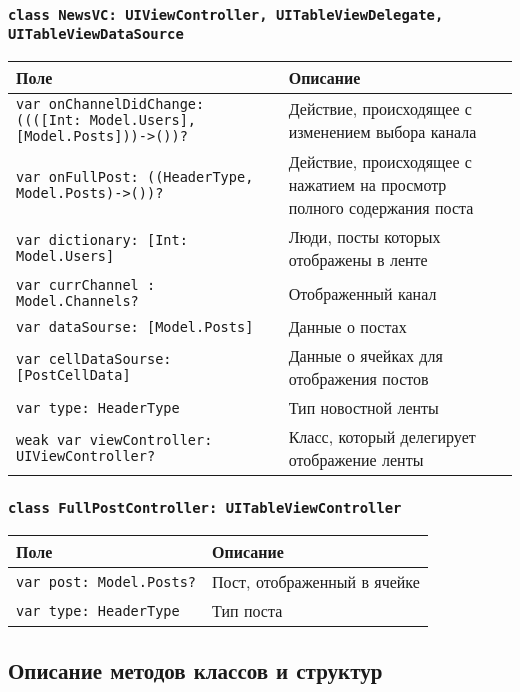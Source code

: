 \subsubsection*{\texttt{class NewsVC: UIViewController, UITableViewDelegate, UITableViewDataSource}}

\begin{longtable}{| >{\raggedright\arraybackslash}p{} | p{}|}
\hline
\textbf{Поле} & \textbf{Описание} \\ \hline
\texttt{var onChannelDidChange: ((([Int: Model.Users],[Model.Posts]))->())?} & {Действие, происходящее с изменением выбора канала} \\ \hline
\texttt{var onFullPost: ((HeaderType, Model.Posts)->())?} & {Действие, происходящее с нажатием на просмотр полного содержания поста} \\ \hline
\texttt{var dictionary: [Int: Model.Users] } & {Люди, посты которых отображены в ленте} \\ \hline
\texttt{var currChannel : Model.Channels?} & {Отображенный канал} \\ \hline
\texttt{var dataSourse: [Model.Posts] } & {Данные о постах} \\ \hline
\texttt{var cellDataSourse: [PostCellData] } & {Данные о ячейках для отображения постов} \\ \hline
\texttt{var type: HeaderType } & {Тип новостной ленты} \\ \hline
\texttt{weak var viewController: UIViewController?} & {Класс, который делегирует отображение ленты} \\ \hline
\end{longtable}

\subsubsection*{\texttt{class FullPostController: UITableViewController}}

\begin{longtable}{| >{\raggedright\arraybackslash}p{} | p{}|}
\hline
\textbf{Поле} & \textbf{Описание} \\ \hline
\texttt{var post: Model.Posts?} & {Пост, отображенный в ячейке} \\ \hline
\texttt{var type: HeaderType } & {Тип поста} \\ \hline
\end{longtable}


\subsection*{Описание методов классов и структур}

